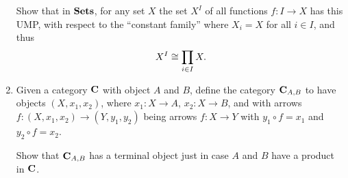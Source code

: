 \documentclass{scrartcl}
\begin{document}
\begin{enumerate}
  Show that in $\mathbf{Sets}$, for any set $X$ the set $X^I$ of all functions $f:I \rightarrow X$ has this UMP, with respect to the ``constant family'' where $X_i = X$ for all $i \in I$, and thus
  $$
  X^I \cong \prod_{i \in I} X.
  $$

\item

  Given a category $\mathbf{C}$ with object $A$ and $B$, define the category $\mathbf{C}_{A,B}$ to have objects $(X,x_1,x_2)$, where $x_1:X \rightarrow A$, $x_2: X \rightarrow B$, and with arrows $f:(X,x_1,x_2) \rightarrow (Y,y_1,y_2)$ being arrows $f:X \rightarrow Y$ with $y_1 \circ f = x_1$ and $y_2 \circ f = x_2$.

  Show that $\mathbf{C}_{A,B}$ has a terminal object just in case $A$ and $B$ have a product in $\mathbf{C}$.
\end{enumerate}
\end{document}
